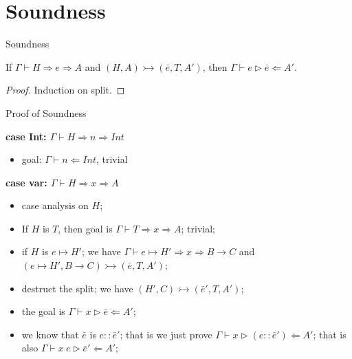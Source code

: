 \section{Soundness}

\begin{frame}{Soundness}

\begin{lemma}[Soundness]
If $\Gamma \vdash H \Rightarrow e \Rightarrow A$ and  $(H, A) \rightarrowtail (\bar{e}, T, A')$, then $\Gamma \vdash e \vartriangleright \bar{e} \Leftarrow A'$.
\end{lemma}

\begin{proof}
Induction on  split.
\end{proof}
\end{frame}

\begin{frame}{Proof of Soundness}

\textbf{case Int: $\Gamma \vdash H \Rightarrow n \Rightarrow Int$}
\begin{itemize}
	\item goal: $\Gamma \vdash n \Leftarrow Int$, trivial
\end{itemize}

\noindent\makebox[\linewidth]{\rule{0.9\paperwidth}{0.4pt}}
 
 \textbf{case var: $\Gamma \vdash H \Rightarrow x \Rightarrow A$}
 
\begin{itemize}
	\item case analysis on $H$;
	\item If $H$ is $T$, then goal is $\Gamma \vdash T \Rightarrow x \Rightarrow A$; trivial;
	\item if $H$ is $\boxed{e} \mapsto H'$; we have $\Gamma \vdash \boxed{e} \mapsto H' \Rightarrow x \Rightarrow B \rightarrow C$ and $(\boxed{e} \mapsto H', B \rightarrow C)\rightarrowtail (\bar{e}, T, A')$;
	\item destruct the split; we have $(H', C)  \rightarrowtail (\bar{e}', T, A')$;
	\item the goal is $\Gamma \vdash x \triangleright \bar{e} \Leftarrow A'$;
	\item we know that $\bar{e}$ is $e :: \bar{e}'$; that is we just prove $\Gamma \vdash x \triangleright (e :: \bar{e}') \Leftarrow A'$; that is also $\Gamma \vdash x~e \triangleright \bar{e}' \Leftarrow A'$;
\end{itemize}

\end{frame}



